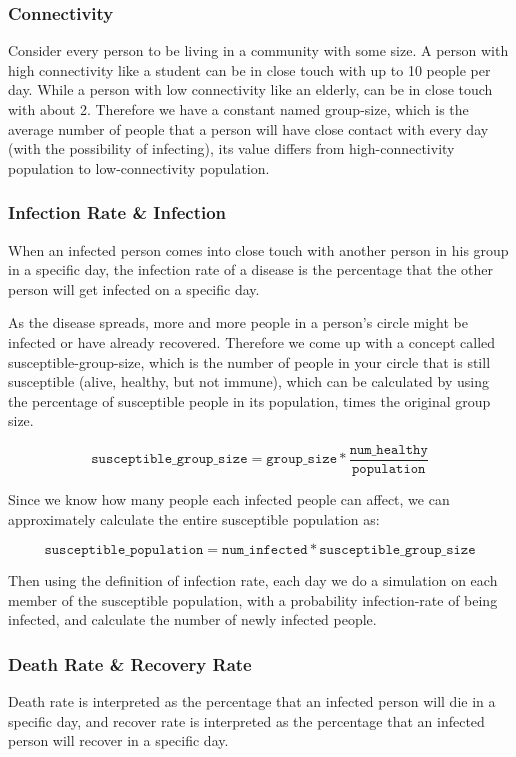 \documentclass[titlepage]{article}
\begin{document}
\subsubsection{Connectivity}
Consider every person to be living in a community with some size. A person with high connectivity like a student can be in close touch with up to 10 people per day. While a person with low connectivity like an elderly, can be in close touch with about 2. Therefore we have a constant named group-size, which is the average number of people that a person will have close contact with every day (with the possibility of infecting), its value differs from high-connectivity population to low-connectivity population.

\subsubsection{Infection Rate \& Infection}
When an infected person comes into close touch with another person in his group in a specific day, the infection rate of a disease is the percentage that the other person will get infected on a specific day.

As the disease spreads, more and more people in a person's circle might be infected or have already recovered. Therefore we come up with a concept called susceptible-group-size, which is the number of people in your circle that is still susceptible (alive, healthy, but not immune), which can be calculated by using the percentage of susceptible people in its population, times the original group size.

$$\texttt{susceptible\_group\_size} = \texttt{group\_size} * \frac{\texttt{num\_healthy}}{\texttt{population}}$$

Since we know how many people each infected people can affect, we can approximately calculate the entire susceptible population as:

$$\texttt{susceptible\_population} = \texttt{num\_infected} * \texttt{susceptible\_group\_size}$$

Then using the definition of infection rate, each day we do a simulation on each member of the susceptible population, with a probability infection-rate of being infected, and calculate the number of newly infected people.

\subsubsection{Death Rate \& Recovery Rate}
Death rate is interpreted as the percentage that an infected person will die in a specific day, and recover rate is interpreted as the percentage that an infected person will recover in a specific day.
\end{document}
